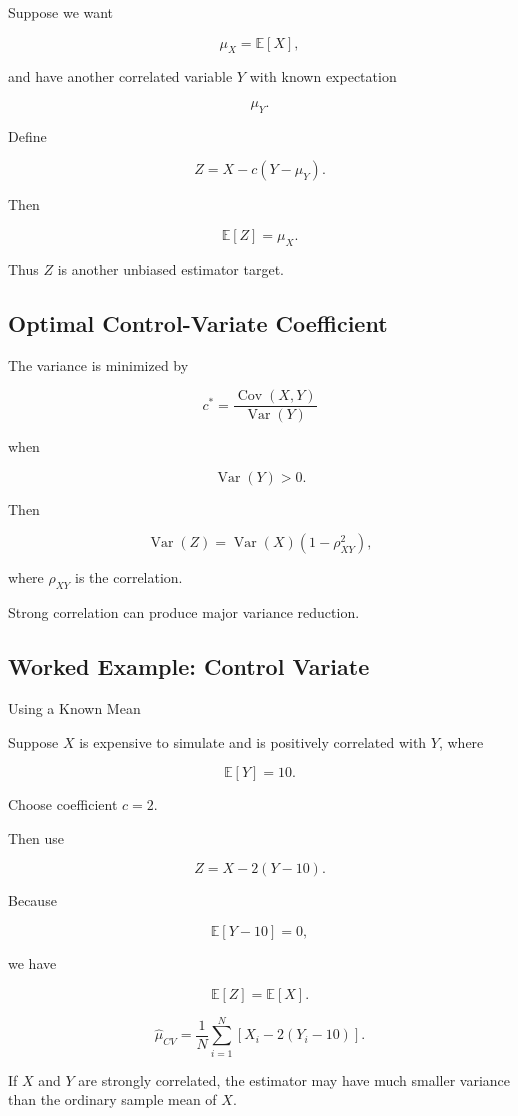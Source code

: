 Suppose we want

\[
\mu_X
=
\mathbb{E}[X],
\]

and have another correlated variable \(Y\) with known expectation

\[
\mu_Y.
\]

Define

\[
\boxed{
Z
=
X
-
c
(
Y-\mu_Y
).
}
\]

Then

\[
\boxed{
\mathbb{E}[Z]
=
\mu_X.
}
\]

Thus \(Z\) is another unbiased estimator target.

\subsection{Optimal Control-Variate Coefficient}
\label{subsec:optimal-control-variate}

The variance is minimized by

\[
\boxed{
c^*
=
\frac{
\operatorname{Cov}(X,Y)
}{
\operatorname{Var}(Y)
}
}
\]

when

\[
\operatorname{Var}(Y)>0.
\]

Then

\[
\boxed{
\operatorname{Var}(Z)
=
\operatorname{Var}(X)
\left(
1-\rho_{XY}^2
\right),
}
\]

where \(\rho_{XY}\) is the correlation.

Strong correlation can produce major variance reduction.

\subsection{Worked Example: Control Variate}
\label{subsec:worked-control-variate}

\begin{workedexamplebox}{Using a Known Mean}

Suppose \(X\) is expensive to simulate and is positively correlated with
\(Y\), where

\[
\mathbb{E}[Y]=10.
\]

Choose coefficient \(c=2\).

Then use

\[
Z
=
X
-
2(Y-10).
\]

Because

\[
\mathbb{E}[Y-10]=0,
\]

we have

\[
\mathbb{E}[Z]
=
\mathbb{E}[X].
\]

\begin{answerbox}
\[
\boxed{
\widehat{\mu}_{CV}
=
\frac1N
\sum_{i=1}^{N}
\left[
X_i-2(Y_i-10)
\right].
}
\]
\end{answerbox}

If \(X\) and \(Y\) are strongly correlated, the estimator may have much
smaller variance than the ordinary sample mean of \(X\).

\end{workedexamplebox}

